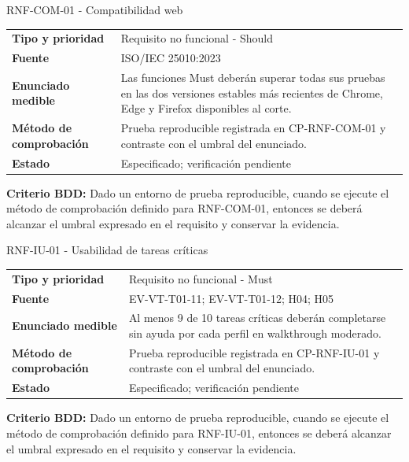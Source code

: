 \documentclass[11pt,a4paper]{article}
\begin{document}
\begin{reqbox}[colframe=Teal]{RNF-COM-01 - Compatibilidad web}
\begin{tabularx}{\textwidth}{>{\bfseries}p{3.2cm}Y}
Tipo y prioridad & Requisito no funcional - Should \\
Fuente & ISO/IEC 25010:2023 \\
Enunciado medible & Las funciones Must deberán superar todas sus pruebas en las dos versiones estables más recientes de Chrome, Edge y Firefox disponibles al corte. \\
Método de comprobación & Prueba reproducible registrada en CP-RNF-COM-01 y contraste con el umbral del enunciado. \\
Estado & Especificado; verificación pendiente \\
\end{tabularx}
\textbf{Criterio BDD:} Dado un entorno de prueba reproducible, cuando se ejecute el método de comprobación definido para RNF-COM-01, entonces se deberá alcanzar el umbral expresado en el requisito y conservar la evidencia.
\end{reqbox}


\begin{reqbox}[colframe=Teal]{RNF-IU-01 - Usabilidad de tareas críticas}
\begin{tabularx}{\textwidth}{>{\bfseries}p{3.2cm}Y}
Tipo y prioridad & Requisito no funcional - Must \\
Fuente & EV-VT-T01-11; EV-VT-T01-12; H04; H05 \\
Enunciado medible & Al menos 9 de 10 tareas críticas deberán completarse sin ayuda por cada perfil en walkthrough moderado. \\
Método de comprobación & Prueba reproducible registrada en CP-RNF-IU-01 y contraste con el umbral del enunciado. \\
Estado & Especificado; verificación pendiente \\
\end{tabularx}
\textbf{Criterio BDD:} Dado un entorno de prueba reproducible, cuando se ejecute el método de comprobación definido para RNF-IU-01, entonces se deberá alcanzar el umbral expresado en el requisito y conservar la evidencia.
\end{reqbox}
\end{document}
